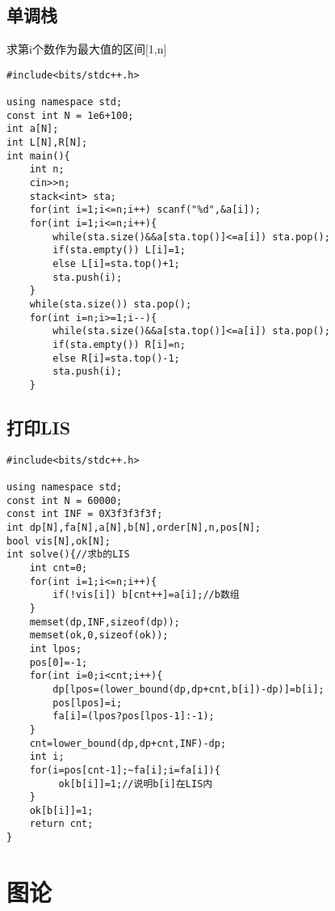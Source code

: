 \documentclass[twocolumn,a4]{article}
\begin{document}
\subsection{单调栈}
求第i个数作为最大值的区间[1,n]
\begin{lstlisting}
#include<bits/stdc++.h>

using namespace std;
const int N = 1e6+100;
int a[N];
int L[N],R[N];
int main(){
	int n;
	cin>>n;
	stack<int> sta;
	for(int i=1;i<=n;i++) scanf("%d",&a[i]);
	for(int i=1;i<=n;i++){
		while(sta.size()&&a[sta.top()]<=a[i]) sta.pop();
		if(sta.empty()) L[i]=1;
		else L[i]=sta.top()+1;
		sta.push(i);
	}
	while(sta.size()) sta.pop();
	for(int i=n;i>=1;i--){
		while(sta.size()&&a[sta.top()]<=a[i]) sta.pop();
		if(sta.empty()) R[i]=n;
		else R[i]=sta.top()-1;
		sta.push(i);
	}
\end{lstlisting}
\subsection{打印LIS}
\begin{lstlisting}
#include<bits/stdc++.h>

using namespace std;
const int N = 60000;
const int INF = 0X3f3f3f3f;
int dp[N],fa[N],a[N],b[N],order[N],n,pos[N];
bool vis[N],ok[N];
int solve(){//求b的LIS
	int cnt=0;
	for(int i=1;i<=n;i++){
		if(!vis[i]) b[cnt++]=a[i];//b数组
	}
	memset(dp,INF,sizeof(dp));
	memset(ok,0,sizeof(ok));
	int lpos;
	pos[0]=-1;
	for(int i=0;i<cnt;i++){
		dp[lpos=(lower_bound(dp,dp+cnt,b[i])-dp)]=b[i];
		pos[lpos]=i;
		fa[i]=(lpos?pos[lpos-1]:-1);
	}
	cnt=lower_bound(dp,dp+cnt,INF)-dp;
	int i;
	for(i=pos[cnt-1];~fa[i];i=fa[i]){
		 ok[b[i]]=1;//说明b[i]在LIS内
	}
	ok[b[i]]=1;
	return cnt;
}
\end{lstlisting}
\section{图论}
\end{document}
